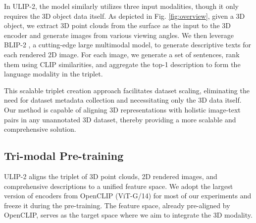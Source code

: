 \documentclass[10pt,twocolumn,letterpaper]{article}
\begin{document}
In ULIP-2, the model similarly utilizes three input modalities, though it only requires the 3D object data itself. As depicted in Fig. \ref{fig:overview}, given a 3D object, we extract 3D point clouds from the surface as the input to the 3D encoder and generate images from various viewing angles. We then leverage BLIP-2 \cite{li2023blip}, a cutting-edge large multimodal model, to generate descriptive texts for each rendered 2D image. For each image, we generate a set of sentences, rank them using CLIP similarities, and aggregate the top-1 description to form the language modality in the triplet.

This scalable triplet creation approach facilitates dataset scaling, eliminating the need for dataset metadata collection and necessitating only the 3D data itself. Our method is capable of aligning 3D representations with holistic image-text pairs in any unannotated 3D dataset, thereby providing a more scalable and comprehensive solution.


\subsection{Tri-modal Pre-training}
ULIP-2 aligns the triplet of 3D point clouds, 2D rendered images, and comprehensive descriptions to a unified feature space. We adopt the largest version of encoders from OpenCLIP (ViT-G/14) \cite{ilharco_gabriel_2021_5143773} for most of our experiments and freeze it during the pre-training. The feature space, already pre-aligned by OpenCLIP, serves as the target space where we aim to integrate the 3D modality.
\end{document}
